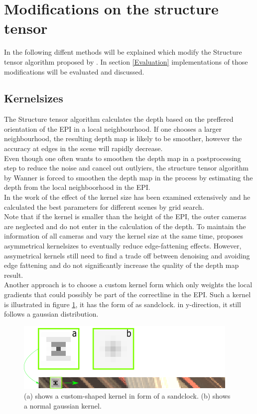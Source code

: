 \documentclass  [
  paper    = a4,
  BCOR     = 10mm,
  twoside,
  fontsize = 12pt,
  fleqn,
  toc      = bibnumbered,
  toc      = listofnumbered,
  numbers  = noendperiod,
  headings = normal,
  listof   = leveldown,
  version  = 3.03
]                                       {scrreprt}
\begin{document}
 \section{Modifications on the structure tensor}
 In the following diffent methods will be explained which modify the Structure tensor algorithm proposed by \cite{wanner2014orientation}. In section \ref{Evaluation} implementations of those modifications will be evaluated and discussed.
 \subsection{Kernelsizes}
 The Structure tensor algorithm calculates the depth based on the preffered orientation of the EPI in a local neighbourhood. If one chooses a larger neighbourhood, the resulting depth map is likely to be smoother, however the accuracy at edges in the scene will rapidly decrease.\\
 Even though one often wants to smoothen the depth map in a postprocessing step to reduce the noise and cancel out outlyiers, the structure tensor algorithm by Wanner is forced to smoothen the depth map in the process by estimating the depth from the local neighboorhood in the EPI.\\
 In the work of \cite{wanner2014orientation} the effect of the kernel size has been examined extensively and he calculated the best parameters for different scenes by grid search.\\
 Note that if the kernel is smaller than the height of the EPI, the outer cameras are neglected and do not enter in the calculation of the depth. To maintain the information of all cameras and vary the kernel size at the same time, \cite{diebold2016light} proposes asymmetrical kernelsizes to eventually reduce edge-fattening effects. However, assymetrical kernels still need to find a trade off between denoising and avoiding edge fattening and do not significantly increase the quality of the depth map result.\\
 Another approach is to choose a custom kernel form which only weights the local gradients that could possibly be part of the \glqq correct\grqq line in the EPI. Such a kernel is illustrated in figure \ref{fig:sandclock},  it has the form of as sandclock. in y-direction, it still follows a gaussian distribution.
 \begin{figure}
 	\centering
 	\includegraphics[width=0.7\linewidth]{images/sandclock.png}
 	\caption[Sandclock Kernel]{(a) shows a custom-shaped kernel in form of a sandclock. (b) shows a normal gaussian kernel.}
 	\label{fig:sandclock}
 \end{figure}
 
\end{document}
